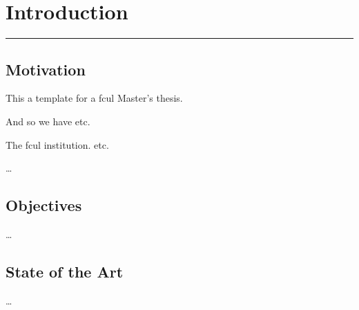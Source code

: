 \chapter{Introduction}

\lhead{}

\vspace{-1.6cm}
\begingroup
\color{gray}
\par\noindent\rule{\textwidth}{0.4pt}
\endgroup


\section{Motivation}

This a template for a \ac{fcul} Master's thesis.

And so we have \ac{etc}.

The \ac{fcul} institution. \Ac{etc}.

\ldots


\section{Objectives}

\ldots


\section{State of the Art}

\ldots
